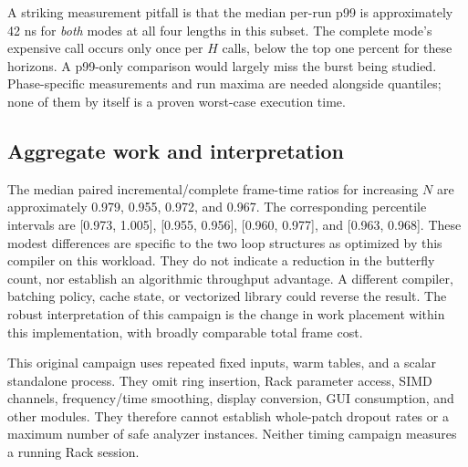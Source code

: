 A striking measurement pitfall is that the median per-run p99 is approximately
42 ns for \emph{both} modes at all four lengths in this subset. The complete
mode's expensive call occurs only once per $H$ calls, below the top one percent
for these horizons. A p99-only comparison would largely miss the burst being
studied. Phase-specific measurements and run maxima are needed alongside
quantiles; none of them by itself is a proven worst-case execution time.

\subsection{Aggregate work and interpretation}
The median paired incremental/complete frame-time ratios for increasing $N$
are approximately 0.979, 0.955, 0.972, and 0.967. The corresponding percentile
intervals are [0.973, 1.005], [0.955, 0.956], [0.960, 0.977], and
[0.963, 0.968]. These modest differences are specific to the two loop structures
as optimized by this compiler on this workload. They do not indicate a reduction
in the butterfly count, nor establish an algorithmic throughput advantage. A
different compiler, batching policy, cache state, or vectorized library could
reverse the result. The robust interpretation of this campaign is the change
in work placement within this implementation, with broadly comparable total
frame cost.

This original campaign uses repeated fixed inputs, warm tables, and a scalar standalone
process. They omit ring insertion, Rack parameter access, SIMD channels,
frequency/time smoothing, display conversion, GUI consumption, and other
modules. They therefore cannot establish whole-patch dropout rates or a maximum
number of safe analyzer instances. Neither timing campaign measures a running Rack session.

